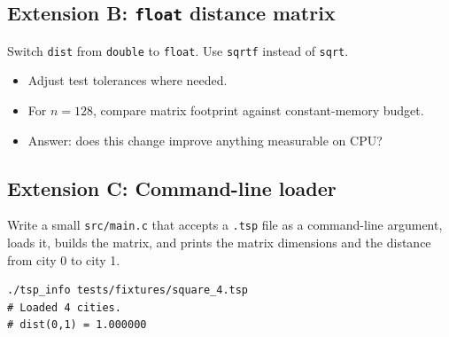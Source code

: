 \documentclass[11pt]{article}
\begin{document}
\subsection*{Extension B: \texttt{float} distance matrix}
Switch \texttt{dist} from \texttt{double} to \texttt{float}. Use \texttt{sqrtf} instead of \texttt{sqrt}.
\begin{itemize}
  \item Adjust test tolerances where needed.
  \item For $n = 128$, compare matrix footprint against constant-memory budget.
  \item Answer: does this change improve anything measurable on CPU?
\end{itemize}

\subsection*{Extension C: Command-line loader}
Write a small \texttt{src/main.c} that accepts a \texttt{.tsp} file as a command-line argument, loads it, builds the matrix, and prints the matrix dimensions and the distance from city 0 to city 1.

\begin{lstlisting}[style=shellstyle]
./tsp_info tests/fixtures/square_4.tsp
# Loaded 4 cities.
# dist(0,1) = 1.000000
\end{lstlisting}
\end{document}
